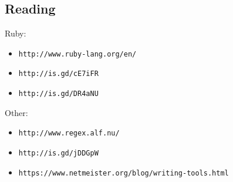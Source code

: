 \documentclass[xga]{xdvislides}
\begin{document}
\subsection{Reading}
Ruby:
\begin{itemize}
	\item \verb+http://www.ruby-lang.org/en/+
	\item \verb+http://is.gd/cE7iFR+
	\item \verb+http://is.gd/DR4aNU+
\end{itemize}

Other:
\begin{itemize}
	\item \verb+http://www.regex.alf.nu/+
	\item \verb+http://is.gd/jDDGpW+
	\item \verb+https://www.netmeister.org/blog/writing-tools.html+
\end{itemize}
\end{document}
